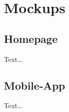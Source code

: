 \chapter{Mockups}
\label{ch:app-A}

\section{Homepage}
\label{sec:app-AI}

Text\dots\clearpage

\section{Mobile-App}
\label{sec:app-AII}

Text\dots